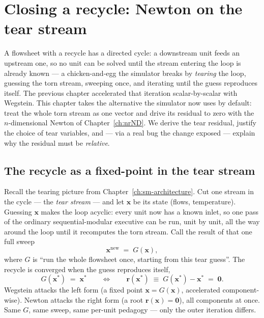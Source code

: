 \documentclass[11pt,a4paper]{article}
\begin{document}
\section{Closing a recycle: Newton on the tear stream}\label{ch:newton-tears}

\begin{whatyoulllearn}
A flowsheet with a recycle has a directed cycle: a downstream unit
feeds an upstream one, so no unit can be solved until the stream
entering the loop is already known --- a chicken-and-egg the simulator
breaks by \emph{tearing} the loop, guessing the torn stream, sweeping
once, and iterating until the guess reproduces itself.  The previous
chapter accelerated that iteration scalar-by-scalar with Wegstein.
This chapter takes the alternative the simulator now uses by default:
treat the whole torn stream as one vector and drive its residual to
zero with the $n$-dimensional Newton of Chapter~\ref{ch:nrND}.  We
derive the tear residual, justify the choice of tear variables, and
--- via a real bug the change exposed --- explain why the residual must
be \emph{relative}.
\end{whatyoulllearn}

\subsection{The recycle as a fixed-point in the tear stream}

Recall the tearing picture from Chapter~\ref{ch:sm-architecture}.  Cut
one stream in the cycle --- the \emph{tear stream} --- and let
$\mathbf{x}$ be its state (flows, temperature).  Guessing
$\mathbf{x}$ makes the loop acyclic: every unit now has a known inlet,
so one pass of the ordinary sequential-modular executive can be run,
unit by unit, all the way around the loop until it recomputes the torn
stream.  Call the result of that one full sweep
\begin{equation}
   \mathbf{x}^{\text{new}} \;=\; G(\mathbf{x}),
\end{equation}
where $G$ is ``run the whole flowsheet once, starting from this tear
guess''.  The recycle is converged when the guess reproduces itself,
\begin{equation}
   G(\mathbf{x}^{\!*}) \;=\; \mathbf{x}^{\!*}
   \qquad\Longleftrightarrow\qquad
   \mathbf{r}(\mathbf{x}^{\!*}) \;\equiv\; G(\mathbf{x}^{\!*}) - \mathbf{x}^{\!*} \;=\; \mathbf{0}.
   \label{eq:tear-residual}
\end{equation}
Wegstein attacks the left form (a fixed point $\mathbf{x} = G(\mathbf{x})$,
accelerated component-wise).  Newton attacks the right form (a root
$\mathbf{r}(\mathbf{x}) = \mathbf{0}$), all components at once.  Same
$G$, same sweep, same per-unit pedagogy --- only the outer iteration
differs.
\end{document}
